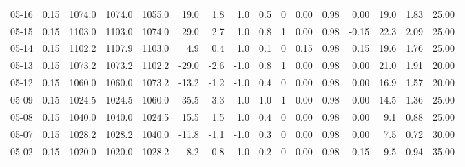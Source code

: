 \begin{threeparttable}
{\begin{tabular}{lrrrrrrrrrrrrrrr}
  05-16 &     0.15 & 1074.0 & 1074.0 & 1055.0 &       19.0 &            1.8 &                      1.0 &                 0.5 &              0 &       0.00 &      0.98 &           0.00 &             19.0 &            1.83 &                  25.00 \\
  05-15 &     0.15 & 1103.0 & 1103.0 & 1074.0 &       29.0 &            2.7 &                      1.0 &                 0.8 &              1 &       0.00 &      0.98 &          -0.15 &             22.3 &            2.09 &                  25.00 \\
  05-14 &     0.15 & 1102.2 & 1107.9 & 1103.0 &        4.9 &            0.4 &                      1.0 &                 0.1 &              0 &       0.15 &      0.98 &           0.15 &             19.6 &            1.76 &                  25.00 \\
  05-13 &     0.15 & 1073.2 & 1073.2 & 1102.2 &      -29.0 &           -2.6 &                     -1.0 &                 0.8 &              1 &       0.00 &      0.98 &           0.00 &             21.0 &            1.91 &                  20.00 \\
  05-12 &     0.15 & 1060.0 & 1060.0 & 1073.2 &      -13.2 &           -1.2 &                     -1.0 &                 0.4 &              0 &       0.00 &      0.98 &           0.00 &             16.9 &            1.57 &                  20.00 \\
  05-09 &     0.15 & 1024.5 & 1024.5 & 1060.0 &      -35.5 &           -3.3 &                     -1.0 &                 1.0 &              1 &       0.00 &      0.98 &           0.00 &             14.5 &            1.36 &                  25.00 \\
  05-08 &     0.15 & 1040.0 & 1040.0 & 1024.5 &       15.5 &            1.5 &                      1.0 &                 0.4 &              0 &       0.00 &      0.98 &           0.00 &              9.1 &            0.88 &                  25.00 \\
  05-07 &     0.15 & 1028.2 & 1028.2 & 1040.0 &      -11.8 &           -1.1 &                     -1.0 &                 0.3 &              0 &       0.00 &      0.98 &           0.00 &              7.5 &            0.72 &                  30.00 \\
  05-02 &     0.15 & 1020.0 & 1020.0 & 1028.2 &       -8.2 &           -0.8 &                     -1.0 &                 0.2 &              0 &       0.00 &      0.98 &          -0.15 &              9.5 &            0.94 &                  35.00 \\

\end{tabular}}
\end{threeparttable}
